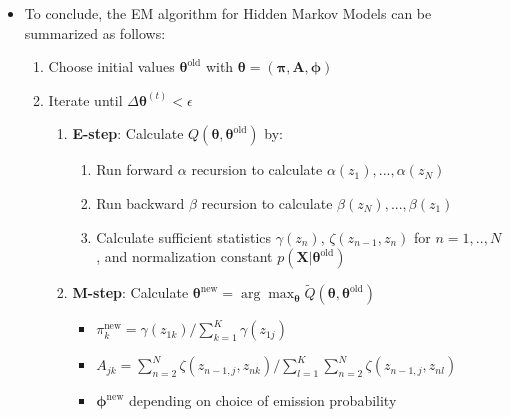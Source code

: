 \begin{itemize}
	\item To conclude, the EM algorithm for Hidden Markov Models can be summarized as follows:
	\begin{tcolorbox}[colback=white!85!gray,colframe=gray!75!black,title=EM for HMM]
		\begin{enumerate}
			\item Choose initial values $\bm{\theta}^{\text{old}}$ with $\bm{\theta}=(\bm{\pi}, \bm{A}, \bm{\phi})$
			\item Iterate until $\Delta \bm{\theta}^{(t)} < \epsilon$
			\begin{enumerate}
				\item \textbf{E-step}: Calculate $Q(\bm{\theta}, \bm{\theta}^{\text{old}})$ by:
				\begin{enumerate}
					\item Run forward $\alpha$ recursion to calculate $\alpha(z_1),...,\alpha(z_N)$
					\item Run backward $\beta$ recursion to calculate $\beta(z_N),...,\beta(z_1)$
					\item Calculate sufficient statistics $\gamma(z_n)$, $\zeta(z_{n-1},z_n)$ for $n=1,..,N$, and normalization constant $p(\bm{X}|\bm{\theta}^{\text{old}})$
				\end{enumerate}
				\item \textbf{M-step}: Calculate $\bm{\theta}^{\text{new}}=\arg\max_{\bm{\theta}} \tilde{Q}(\bm{\theta}, \bm{\theta}^{\text{old}})$
				\begin{itemize}
					\item $\pi_k^{\text{new}}=\gamma(z_{1k})/\sum_{k=1}^{K}\gamma(z_{1j})$
					\item $A_{jk}=\sum_{n=2}^{N} \zeta(z_{n-1,j}, z_{nk})/\sum_{l=1}^{K}\sum_{n=2}^{N} \zeta(z_{n-1,j}, z_{nl})$
					\item $\bm{\phi}^{\text{new}}$ depending on choice of emission probability
				\end{itemize}
			\end{enumerate}
		\end{enumerate}
	\end{tcolorbox}
\end{itemize}

